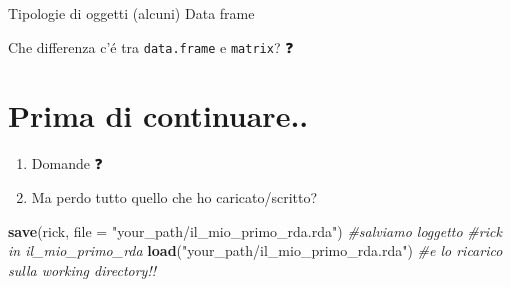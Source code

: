 \documentclass[
  ignorenonframetext,
]{beamer}
\newenvironment{Shaded}{\begin{snugshade}}{\end{snugshade}}
\newcommand{\CommentTok}[1]{\textcolor[rgb]{0.56,0.35,0.01}{\textit{#1}}}
\newcommand{\DataTypeTok}[1]{\textcolor[rgb]{0.13,0.29,0.53}{#1}}
\newcommand{\DecValTok}[1]{\textcolor[rgb]{0.00,0.00,0.81}{#1}}
\newcommand{\KeywordTok}[1]{\textcolor[rgb]{0.13,0.29,0.53}{\textbf{#1}}}
\newcommand{\NormalTok}[1]{#1}
\newcommand{\OperatorTok}[1]{\textcolor[rgb]{0.81,0.36,0.00}{\textbf{#1}}}
\newcommand{\StringTok}[1]{\textcolor[rgb]{0.31,0.60,0.02}{#1}}
\begin{document}
\begin{frame}[fragile]{Tipologie di oggetti (alcuni)}
\protect\hypertarget{tipologie-di-oggetti-alcuni-2}{}
Data frame

\begin{Shaded}
\end{Shaded}

Che differenza c'é tra \texttt{data.frame} e \texttt{matrix}? ❓
\end{frame}

\hypertarget{prima-di-continuare..}{%
\section{Prima di continuare..}\label{prima-di-continuare..}}

\begin{frame}[fragile]{}
\protect\hypertarget{section}{}
\begin{enumerate}
\item
  Domande ❓
\item
  Ma perdo tutto quello che ho caricato/scritto?
\end{enumerate}

\begin{Shaded}
\begin{Highlighting}[]
\KeywordTok{save}\NormalTok{(rick, }\DataTypeTok{file =} \StringTok{"your\_path/il\_mio\_primo\_rda.rda"}\NormalTok{) }\CommentTok{\#salviamo l\textquotesingle{}oggetto }
\CommentTok{\#rick in il\_mio\_primo\_rda}
\KeywordTok{load}\NormalTok{(}\StringTok{"your\_path/il\_mio\_primo\_rda.rda"}\NormalTok{) }\CommentTok{\#e lo ricarico sulla working directory!!}
\end{Highlighting}
\end{Shaded}
\end{frame}
\end{document}
